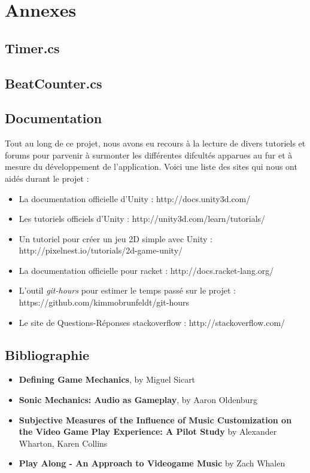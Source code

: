 \chapter{Annexes}

\section*{Timer.cs}

\section*{BeatCounter.cs}


\newpage

\section*{Documentation}
Tout au long de ce projet, nous avons eu recours à la lecture de divers tutoriels et forums pour parvenir à surmonter les différentes difcultés apparues au fur et à mesure du développement de l’application.
Voici une liste des sites qui nous ont aidés durant le projet :
\begin{itemize}
\item La documentation officielle d'Unity : http://docs.unity3d.com/
\item Les tutoriels officiels d'Unity : http://unity3d.com/learn/tutorials/
\item Un tutoriel pour créer un jeu 2D simple avec Unity : http://pixelnest.io/tutorials/2d-game-unity/
\item La documentation officielle pour racket : http://docs.racket-lang.org/
\item L'outil \textit{git-hours} pour estimer le temps passé sur le projet :  https://github.com/kimmobrunfeldt/git-hours
\item Le site de Questions-Réponses stackoverflow : http://stackoverflow.com/
\end{itemize}

\section*{Bibliographie}
\begin{itemize}
\item \textbf{Defining Game Mechanics}, by Miguel Sicart
\item \textbf{Sonic Mechanics: Audio as Gameplay}, by Aaron Oldenburg 
\item \textbf{Subjective Measures of the Influence of Music Customization on the Video Game Play Experience: A Pilot Study} by Alexander Wharton, Karen Collins
\item \textbf{Play Along - An Approach to Videogame Music} by Zach Whalen
\end{itemize}
